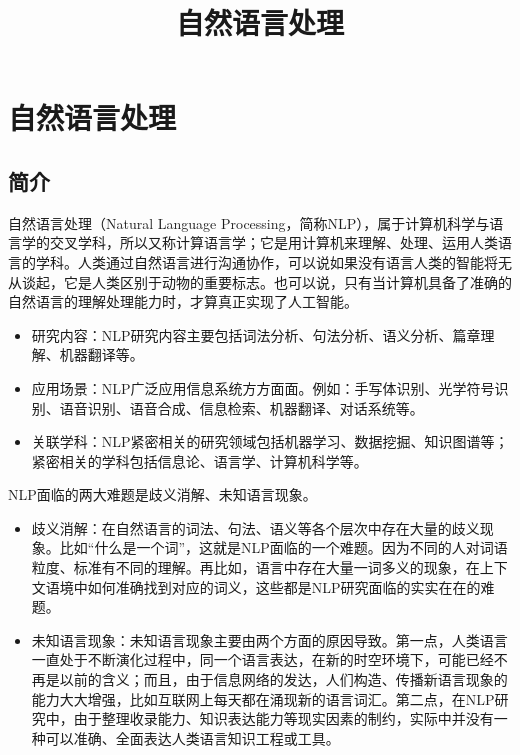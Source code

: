 \documentclass[graybox,envcountchap,sectrefs]{svmono}
\begin{document}
\title{自然语言处理}
\maketitle


\frontmatter%

%
%
%
%

\tableofcontents

%

\mainmatter%

\chapter{自然语言处理}
\label{basic} %


\section{简介}
自然语言处理（Natural Language Processing，简称NLP），属于计算机科学与语言学的交叉学科，所以又称计算语言学；它是用计算机来理解、处理、运用人类语言的学科。人类通过自然语言进行沟通协作，可以说如果没有语言人类的智能将无从谈起，它是人类区别于动物的重要标志。也可以说，只有当计算机具备了准确的自然语言的理解处理能力时，才算真正实现了人工智能。
\begin{itemize}
\item 研究内容：NLP研究内容主要包括词法分析、句法分析、语义分析、篇章理解、机器翻译等。
\item 应用场景：NLP广泛应用信息系统方方面面。例如：手写体识别、光学符号识别、语音识别、语音合成、信息检索、机器翻译、对话系统等。
\item 关联学科：NLP紧密相关的研究领域包括机器学习、数据挖掘、知识图谱等；紧密相关的学科包括信息论、语言学、计算机科学等。
\end{itemize}

NLP面临的两大难题是歧义消解、未知语言现象。
\begin{itemize}
\item 歧义消解：在自然语言的词法、句法、语义等各个层次中存在大量的歧义现象。比如“什么是一个词”，这就是NLP面临的一个难题。因为不同的人对词语粒度、标准有不同的理解。再比如，语言中存在大量一词多义的现象，在上下文语境中如何准确找到对应的词义，这些都是NLP研究面临的实实在在的难题。
\item 未知语言现象：未知语言现象主要由两个方面的原因导致。第一点，人类语言一直处于不断演化过程中，同一个语言表达，在新的时空环境下，可能已经不再是以前的含义；而且，由于信息网络的发达，人们构造、传播新语言现象的能力大大增强，比如互联网上每天都在涌现新的语言词汇。第二点，在NLP研究中，由于整理收录能力、知识表达能力等现实因素的制约，实际中并没有一种可以准确、全面表达人类语言知识工程或工具。
\end{itemize}
\end{document}
